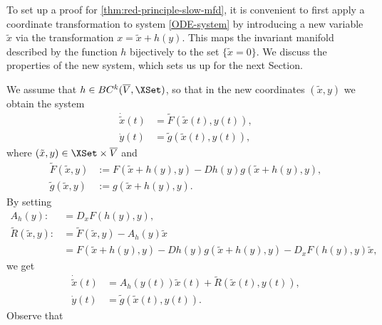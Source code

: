 \documentclass[a4paper]{siamart190516}
\begin{document}
 
To set up a proof for \cref{thm:red-principle-slow-mfd}, it is convenient to
first apply a coordinate transformation to system \cref{ODE-system} by introducing a
new variable $\tilde{x}$ via the transformation $x = \tilde{x} + h(y)$. This maps the
invariant manifold described by the function $h$  bijectively to the set $\{ \tilde x = 0 \}$.
We discuss the properties of the new system, which sets us up for
the next Section. 

We assume that $h \in BC^{k}(\overline{V},\XSet)$, so that in the new coordinates $(\tilde{x},y)$ we obtain the system
\begin{equation}\label{eq:tildeODE}
 \begin{aligned}
 \dot{\tilde{x}}(t) &= \tilde{F}(\tilde{x}(t),y(t)), \\
 \dot{y}(t) &=  \tilde{g}(\tilde{x}(t),y(t)),
 \end{aligned} 
\end{equation}
 where $(\tilde{x},y) \in \XSet \times \overline{V}$ and
 \begin{align*}
 \tilde{F}(\tilde{x},y) &:= F(\tilde{x}+h(y),y) -  Dh(y) g(\tilde{x}+h(y),y), \\
 \tilde{g}(\tilde{x},y) &:= g(\tilde{x}+h(y),y).
 \end{align*}
 By setting
 \begin{align*}
 A_h(y) : &= D_x F(h(y),y), \\
  \tilde{R}(\tilde{x},y) :&=  \tilde{F}(\tilde{x},y) - A_h(y) \tilde{x} \\
  	&= F(\tilde{x}+h(y),y) - Dh(y) g(\tilde{x}+h(y),y) - D_x F(h(y),y) \tilde{x},
  \end{align*}
  we get
   \begin{equation}\label{eq:ODE-system-straight}
 \begin{aligned}
 \dot{\tilde{x}}(t) &= A_h(y(t)) \tilde{x}(t) + \tilde{R}(\tilde{x}(t),y(t)), \\
 \dot{y}(t) &= \tilde{g}(\tilde{x}(t),y(t)).
 \end{aligned} 
 \end{equation}
Observe that
\end{document}
